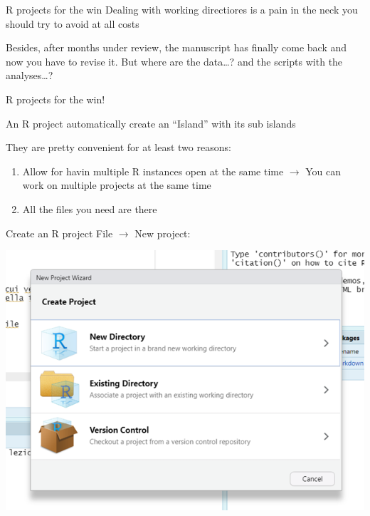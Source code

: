 \documentclass[
  ignorenonframetext,
]{beamer}
\begin{document}
\begin{frame}{R projects for the win}
\protect\hypertarget{r-projects-for-the-win}{}
Dealing with working directiores is a pain in the neck you should try to
avoid at all costs

Besides, after months under review, the manuscript has finally come back
and now you have to revise it. But where are the data\ldots? and the
scripts with the analyses\ldots?

\pause

\begin{center}
R projects for the win!
\end{center}

An R project automatically create an ``Island'' with its sub islands

They are pretty convenient for at least two reasons:

\begin{enumerate}
\item
  Allow for havin multiple R instances open at the same time
  \(\rightarrow\) You can work on multiple projects at the same time
\item
  All the files you need are there
\end{enumerate}
\end{frame}

\begin{frame}{Create an R project}
\protect\hypertarget{create-an-r-project}{}
File \(\rightarrow\) New project:

\begin{center}\includegraphics[width=1\linewidth]{img/project1} \end{center}
\end{frame}
\end{document}
